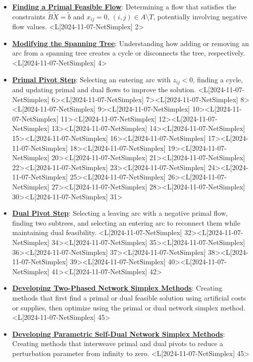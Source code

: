 \documentclass{article}%
\begin{document}
\begin{itemize}[[leftmargin=*]]%
\item \href{https://www.math.purdue.edu/~yipn/421/2024-11-07-NetSimplex.pdf#page=2}{\textbf{Finding a Primal Feasible Flow}}: Determining a flow that satisfies the constraints $\tilde{B}\tilde{X} = \tilde{b}$ and $x_{ij} = 0$, $(i,j) \in A \setminus T$, potentially involving negative flow values. <L[2024-11-07-NetSimplex] 2>%
\item \href{https://www.math.purdue.edu/~yipn/421/2024-11-07-NetSimplex.pdf#page=4}{\textbf{Modifying the Spanning Tree}}: Understanding how adding or removing an arc from a spanning tree creates a cycle or disconnects the tree, respectively. <L[2024-11-07-NetSimplex] 4>%
\item \href{https://www.math.purdue.edu/~yipn/421/2024-11-07-NetSimplex.pdf#page=6}{\textbf{Primal Pivot Step}}: Selecting an entering arc with $z_{ij} < 0$, finding a cycle, and updating primal and dual flows to improve the solution. <L[2024-11-07-NetSimplex] 6><L[2024-11-07-NetSimplex] 7><L[2024-11-07-NetSimplex] 8><L[2024-11-07-NetSimplex] 9><L[2024-11-07-NetSimplex] 10><L[2024-11-07-NetSimplex] 11><L[2024-11-07-NetSimplex] 12><L[2024-11-07-NetSimplex] 13><L[2024-11-07-NetSimplex] 14><L[2024-11-07-NetSimplex] 15><L[2024-11-07-NetSimplex] 16><L[2024-11-07-NetSimplex] 17><L[2024-11-07-NetSimplex] 18><L[2024-11-07-NetSimplex] 19><L[2024-11-07-NetSimplex] 20><L[2024-11-07-NetSimplex] 21><L[2024-11-07-NetSimplex] 22><L[2024-11-07-NetSimplex] 23><L[2024-11-07-NetSimplex] 24><L[2024-11-07-NetSimplex] 25><L[2024-11-07-NetSimplex] 26><L[2024-11-07-NetSimplex] 27><L[2024-11-07-NetSimplex] 28><L[2024-11-07-NetSimplex] 30><L[2024-11-07-NetSimplex] 31>%
\item \href{https://www.math.purdue.edu/~yipn/421/2024-11-07-NetSimplex.pdf#page=32}{\textbf{Dual Pivot Step}}: Selecting a leaving arc with a negative primal flow, finding two subtrees, and selecting an entering arc to reconnect them while maintaining dual feasibility. <L[2024-11-07-NetSimplex] 32><L[2024-11-07-NetSimplex] 34><L[2024-11-07-NetSimplex] 35><L[2024-11-07-NetSimplex] 36><L[2024-11-07-NetSimplex] 37><L[2024-11-07-NetSimplex] 38><L[2024-11-07-NetSimplex] 39><L[2024-11-07-NetSimplex] 40><L[2024-11-07-NetSimplex] 41><L[2024-11-07-NetSimplex] 42>%
\item \href{https://www.math.purdue.edu/~yipn/421/2024-11-07-NetSimplex.pdf#page=45}{\textbf{Developing Two{-}Phased Network Simplex Methods}}: Creating methods that first find a primal or dual feasible solution using artificial costs or supplies, then optimize using the primal or dual network simplex method. <L[2024-11-07-NetSimplex] 45>%
\item \href{https://www.math.purdue.edu/~yipn/421/2024-11-07-NetSimplex.pdf#page=45}{\textbf{Developing Parametric Self{-}Dual Network Simplex Methods}}: Creating methods that interweave primal and dual pivots to reduce a perturbation parameter from infinity to zero. <L[2024-11-07-NetSimplex] 45>%
\end{itemize}%
\end{document}
